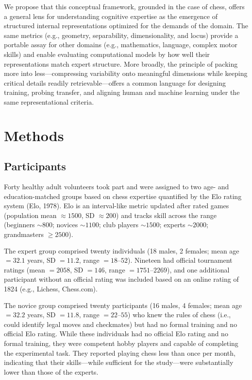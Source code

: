 \documentclass[preprint,12pt]{elsarticle}
\begin{document}
We propose that this conceptual framework, grounded in the case of chess, offers a general lens for understanding cognitive expertise as the emergence of structured internal representations optimized for the demands of the domain. The same metrics (e.g., geometry, separability, dimensionality, and locus) provide a portable assay for other domains (e.g., mathematics, language, complex motor skills) and enable evaluating computational models by how well their representations match expert structure. More broadly, the principle of packing more into less—compressing variability onto meaningful dimensions while keeping critical details readily retrievable—offers a common language for designing training, probing transfer, and aligning human and machine learning under the same representational criteria.

\section{Methods}

\subsection{Participants}
Forty healthy adult volunteers took part and were assigned to two age- and education-matched groups based on chess expertise quantified by the Elo rating system (Elo, 1978). Elo is an interval-like metric updated after rated games (population mean $\approx 1500$, SD $\approx 200$) and tracks skill across the range (beginners $\sim 800$; novices $\sim 1100$; club players $\sim 1500$; experts $\sim 2000$; grandmasters $\geq 2500$).

The expert group comprised twenty individuals (18 males, 2 females; mean age $= 32.1$ years, SD $= 11.2$, range $= 18$--$52$). Nineteen had official tournament ratings (mean $= 2058$, SD $= 146$, range $= 1751$--$2269$), and one additional participant without an official rating was included based on an online rating of 1824 (e.g., Lichess, Chess.com).

The novice group comprised twenty participants (16 males, 4 females; mean age $= 32.2$ years, SD $= 11.8$, range $= 22$--$55$) who knew the rules of chess (i.e., could identify legal moves and checkmates) but had no formal training and no official Elo rating. While these individuals had no official Elo rating and no formal training, they were competent hobby players and capable of completing the experimental task. They reported playing chess less than once per month, indicating that their skills---while sufficient for the study---were substantially lower than those of the experts.
\end{document}
